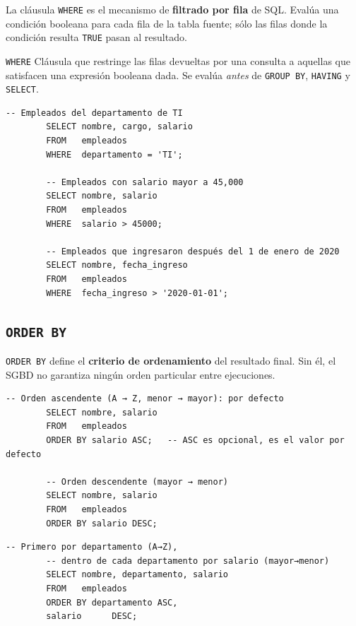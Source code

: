 \documentclass[12pt, a4paper]{article}
\begin{document}
	La cláusula \texttt{WHERE} es el mecanismo de \textbf{filtrado por
		fila} de SQL.
	Evalúa una condición booleana para cada fila de la tabla fuente;
	sólo las filas donde la condición resulta \texttt{TRUE} pasan al
	resultado.
	
	\begin{definicion}{\texttt{WHERE}}
		Cláusula que restringe las filas devueltas por una consulta a
		aquellas que satisfacen una expresión booleana dada.
		Se evalúa \textit{antes} de \texttt{GROUP BY}, \texttt{HAVING} y
		\texttt{SELECT}.
	\end{definicion}
	
	\begin{lstlisting}[caption={Filtros básicos con WHERE.}]
		-- Empleados del departamento de TI
		SELECT nombre, cargo, salario
		FROM   empleados
		WHERE  departamento = 'TI';
		
		-- Empleados con salario mayor a 45,000
		SELECT nombre, salario
		FROM   empleados
		WHERE  salario > 45000;
		
		-- Empleados que ingresaron después del 1 de enero de 2020
		SELECT nombre, fecha_ingreso
		FROM   empleados
		WHERE  fecha_ingreso > '2020-01-01';
	\end{lstlisting}
	
	\subsection{\texttt{ORDER BY}}
	
	\texttt{ORDER BY} define el \textbf{criterio de ordenamiento} del
	resultado final.
	Sin él, el SGBD no garantiza ningún orden particular entre
	ejecuciones.
	
	\begin{lstlisting}[caption={Orden ascendente y descendente.}]
		-- Orden ascendente (A → Z, menor → mayor): por defecto
		SELECT nombre, salario
		FROM   empleados
		ORDER BY salario ASC;   -- ASC es opcional, es el valor por defecto
		
		-- Orden descendente (mayor → menor)
		SELECT nombre, salario
		FROM   empleados
		ORDER BY salario DESC;
	\end{lstlisting}
	
	\begin{lstlisting}[caption={Ordenamiento compuesto por múltiples columnas.}]
		-- Primero por departamento (A→Z),
		-- dentro de cada departamento por salario (mayor→menor)
		SELECT nombre, departamento, salario
		FROM   empleados
		ORDER BY departamento ASC,
		salario      DESC;
	\end{lstlisting}
	
\end{document}
